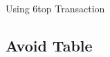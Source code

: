 \begin{withoutheadline}
\begin{frame}{Using 6top Transaction}
\begin{figure}[p]
 
\end{figure}

\end{frame}
\end{withoutheadline}

\subsection{Avoid Table}




